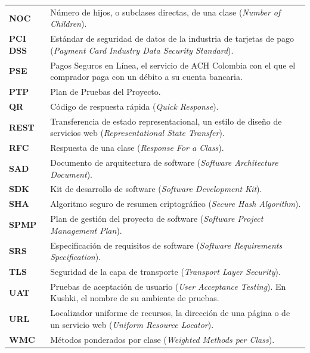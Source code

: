 {\begin{longtable}{@{}>{\bfseries}p{2.4cm}p{12.6cm}@{}}
NOC & Número de hijos, o subclases directas, de una clase (\textit{Number of Children}). \\
PCI DSS & Estándar de seguridad de datos de la industria de tarjetas de pago (\textit{Payment Card Industry Data Security Standard}). \\
PSE & Pagos Seguros en Línea, el servicio de ACH Colombia con el que el comprador paga con un débito a su cuenta bancaria. \\
PTP & Plan de Pruebas del Proyecto. \\
QR & Código de respuesta rápida (\textit{Quick Response}). \\
REST & Transferencia de estado representacional, un estilo de diseño de servicios web (\textit{Representational State Transfer}). \\
RFC & Respuesta de una clase (\textit{Response For a Class}). \\
SAD & Documento de arquitectura de software (\textit{Software Architecture Document}). \\
SDK & Kit de desarrollo de software (\textit{Software Development Kit}). \\
SHA & Algoritmo seguro de resumen criptográfico (\textit{Secure Hash Algorithm}). \\
SPMP & Plan de gestión del proyecto de software (\textit{Software Project Management Plan}). \\
SRS & Especificación de requisitos de software (\textit{Software Requirements Specification}). \\
TLS & Seguridad de la capa de transporte (\textit{Transport Layer Security}). \\
UAT & Pruebas de aceptación de usuario (\textit{User Acceptance Testing}). En Kushki, el nombre de su ambiente de pruebas. \\
URL & Localizador uniforme de recursos, la dirección de una página o de un servicio web (\textit{Uniform Resource Locator}). \\
WMC & Métodos ponderados por clase (\textit{Weighted Methods per Class}). \\
\end{longtable}}
\addtocounter{table}{-1}
